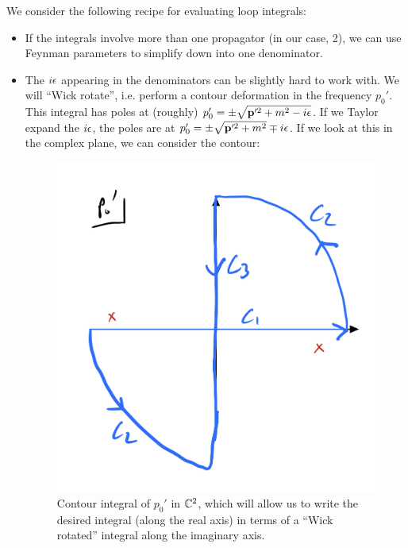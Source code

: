We consider the following recipe for evaluating loop integrals:
\begin{itemize}
    \item If the integrals involve more than one propagator (in our case, 2), we can use Feynman parameters to simplify down into one denominator.
    \item The $i\epsilon$ appearing in the denominators can be slightly hard to work with. We will ``Wick rotate'', i.e. perform a contour deformation in the frequency $p_0'$. This integral has poles at (roughly) $p_0' = \pm \sqrt{\mathbf{p}'^2 + m^2 - i\epsilon}$. If we Taylor expand the $i\epsilon$, the poles are at $p_0' = \pm \sqrt{\mathbf{p}'^2 + m^2} \mp i\epsilon$. If we look at this in the complex plane, we can consider the contour:
    
    \begin{figure}[htbp]
        \centering
        \includegraphics[scale=0.3]{Lectures/Figures/butterflycontour.png}
        \caption{Contour integral of $p_0'$ in $\mathbb{C}^2$, which will allow us to write the desired integral (along the real axis) in terms of a ``Wick rotated'' integral along the imaginary axis.}
        \label{fig:butterflycontour}
    \end{figure}


\end{itemize}
